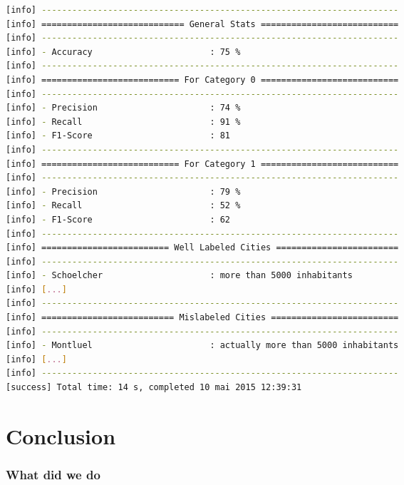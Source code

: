 \documentclass[slidetop,9pt,utf8]{beamer}
\begin{document}
\begin{CJK}{UTF8}{gbsn}
\begin{frame}[fragile]
    \begin{lstlisting}[language=bash, style=terminal]
[info] ----------------------------------------------------------------------
[info] ============================ General Stats ===========================
[info] ----------------------------------------------------------------------
[info] - Accuracy                       : 75 %
[info] ----------------------------------------------------------------------
[info] =========================== For Category 0 ===========================
[info] ----------------------------------------------------------------------
[info] - Precision                      : 74 %
[info] - Recall                         : 91 %
[info] - F1-Score                       : 81
[info] ----------------------------------------------------------------------
[info] =========================== For Category 1 ===========================
[info] ----------------------------------------------------------------------
[info] - Precision                      : 79 %
[info] - Recall                         : 52 %
[info] - F1-Score                       : 62
[info] ----------------------------------------------------------------------
[info] ========================= Well Labeled Cities ========================
[info] ----------------------------------------------------------------------
[info] - Schoelcher                     : more than 5000 inhabitants
[info] [...]
[info] ----------------------------------------------------------------------
[info] ========================== Mislabeled Cities =========================
[info] ----------------------------------------------------------------------
[info] - Montluel                       : actually more than 5000 inhabitants
[info] [...]
[info] ----------------------------------------------------------------------
[success] Total time: 14 s, completed 10 mai 2015 12:39:31
    \end{lstlisting}

\end{frame}

\section{Conclusion}

\begin{frame}
  \frametitle{What did we do}


\end{frame}
\end{CJK}
\end{document}
